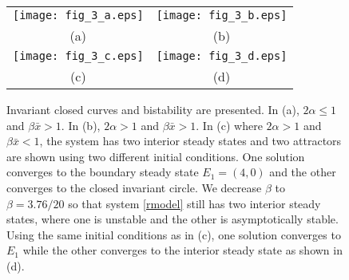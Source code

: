 \documentclass[11pt]{article}
\begin{document}
\begin{figure}
\begin{center}
\begin{tabular}{cc}
\texttt{[image: fig\_3\_a.eps]} &
\texttt{[image: fig\_3\_b.eps]} \\
(a) & (b)
\\
\texttt{[image: fig\_3\_c.eps]} &
\texttt{[image: fig\_3\_d.eps]}\\
(c) & (d)
\end{tabular}
\end{center}
\caption{Invariant closed curves and bistability are presented. In
(a), $2\alpha\leq 1$ and $\beta \bar x>1$. In (b), $2\alpha>1$ and
$\beta \bar x>1$. In (c) where $2\alpha>1$ and $\beta \bar x<1$,
the system has two interior steady states and two attractors are
shown using two different initial conditions. One solution
converges to the boundary steady state $E_1=(4,0)$ and the other
converges to the closed invariant circle. We decrease $\beta$ to
$\beta=3.76/20$ so that system \eqref{rmodel} still has two
interior steady states, where one is unstable and the other is
asymptotically stable. Using the same initial conditions as in
(c), one solution converges to $E_1$ while the other converges to
the interior steady state as shown in (d). }
\end{figure}
\end{document}
